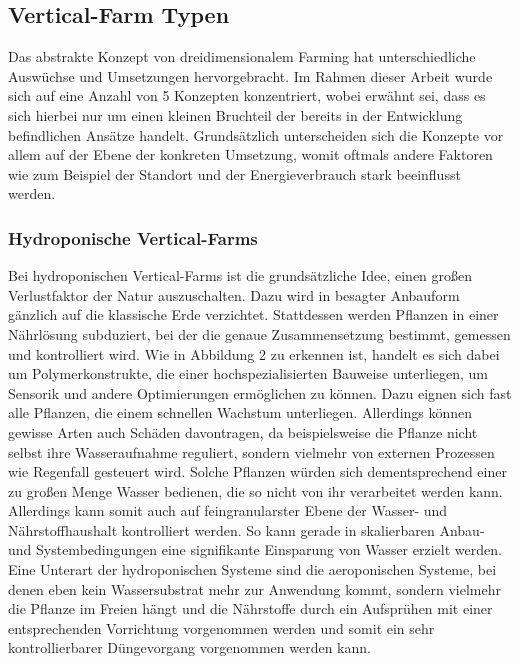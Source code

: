 \subsection{Vertical-Farm Typen}
Das abstrakte Konzept von dreidimensionalem Farming hat unterschiedliche Auswüchse und Umsetzungen hervorgebracht. Im Rahmen dieser Arbeit wurde sich auf eine Anzahl von 5 Konzepten konzentriert, wobei erwähnt sei, dass es sich hierbei nur um einen kleinen Bruchteil der bereits in der Entwicklung befindlichen Ansätze handelt. Grundsätzlich unterscheiden sich die Konzepte vor allem auf der Ebene der konkreten Umsetzung, womit oftmals andere Faktoren wie zum Beispiel der Standort und der Energieverbrauch stark beeinflusst werden. \cite{agronomy12010002}
\subsubsection{Hydroponische Vertical-Farms}
Bei hydroponischen Vertical-Farms ist die grundsätzliche Idee, einen großen Verlustfaktor der Natur auszuschalten. Dazu wird in besagter Anbauform gänzlich auf die klassische Erde verzichtet. Stattdessen werden Pflanzen in einer Nährlösung subduziert, bei der die genaue Zusammensetzung bestimmt, gemessen und kontrolliert wird. Wie in Abbildung 2 zu erkennen ist, handelt es sich dabei um Polymerkonstrukte, die einer hochspezialisierten Bauweise unterliegen, um Sensorik und andere Optimierungen ermöglichen zu können. Dazu eignen sich fast alle Pflanzen, die einem schnellen Wachstum unterliegen. Allerdings können gewisse Arten auch Schäden davontragen, da beispielsweise die Pflanze nicht selbst ihre Wasseraufnahme reguliert, sondern vielmehr von externen Prozessen wie Regenfall gesteuert wird. Solche Pflanzen würden sich dementsprechend einer zu großen Menge Wasser bedienen, die so nicht von ihr verarbeitet werden kann. Allerdings kann somit auch auf feingranularster Ebene der Wasser- und Nährstoffhaushalt kontrolliert werden. So kann gerade in skalierbaren Anbau- und Systembedingungen eine signifikante Einsparung von Wasser erzielt werden. Eine Unterart der hydroponischen Systeme sind die aeroponischen Systeme, bei denen eben kein Wassersubstrat mehr zur Anwendung kommt, sondern vielmehr die Pflanze im Freien hängt und die Nährstoffe durch ein Aufsprühen mit einer entsprechenden Vorrichtung vorgenommen werden und somit ein sehr kontrollierbarer Düngevorgang vorgenommen werden kann. \cite{KANNAN20222163}
